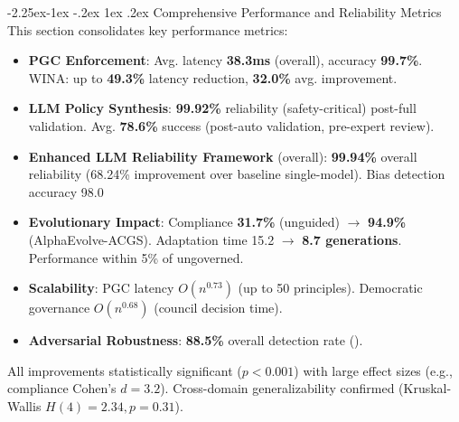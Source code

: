 \documentclass[manuscript,screen,review,anonymous,9pt]{acmart}
\makeatletter
\renewcommand\subsection{\@startsection{subsection}{2}{\z@}%
  {-2.25ex\@plus -1ex \@minus -.2ex}%
  {1ex \@plus .2ex}%
  {\normalfont\large\bfseries}}
\makeatother
\begin{document}
\subsection{Comprehensive Performance and Reliability Metrics}
\label{subsec:comprehensive_performance_analysis} 
This section consolidates key performance metrics:
\begin{itemize}[leftmargin=*,itemsep=1pt,parsep=1pt]
    \item \textbf{PGC Enforcement}: Avg. latency \textbf{38.3ms} (overall), accuracy \textbf{99.7\%}. WINA: up to \textbf{49.3\%} latency reduction, \textbf{32.0\%} avg. improvement.
    \item \textbf{LLM Policy Synthesis}: \textbf{99.92\%} reliability (safety-critical) post-full validation. Avg. \textbf{78.6\%} success (post-auto validation, pre-expert review).
    \item \textbf{Enhanced LLM Reliability Framework} (overall): \textbf{99.94\%} overall reliability (68.24\% improvement over baseline single-model). Bias detection accuracy 98.0%
    \item \textbf{Evolutionary Impact}: Compliance \textbf{31.7\%} (unguided) $\rightarrow$ \textbf{94.9\%} (AlphaEvolve-ACGS). Adaptation time 15.2 $\rightarrow$ \textbf{8.7 generations}. Performance within 5\% of ungoverned.
    \item \textbf{Scalability}: PGC latency $O(n^{0.73})$ (up to 50 principles). Democratic governance $O(n^{0.68})$ (council decision time).
    \item \textbf{Adversarial Robustness}: \textbf{88.5\%} overall detection rate ().
\end{itemize}
All improvements statistically significant ($p < 0.001$) with large effect sizes (e.g., compliance Cohen's $d = 3.2$). Cross-domain generalizability confirmed (Kruskal-Wallis $H(4) = 2.34, p = 0.31$).
\end{document}
